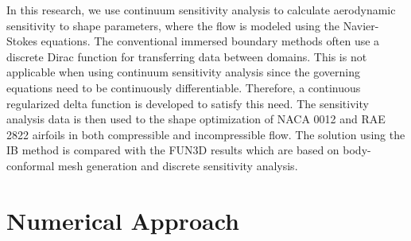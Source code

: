 \documentclass[12pt]{aiaa-pretty}
\begin{document}
In this research, we use continuum sensitivity analysis to calculate aerodynamic sensitivity to shape parameters, where the flow is modeled using the Navier-Stokes equations. The conventional immersed boundary methods often use a discrete Dirac function for transferring data between domains. This is not applicable when using continuum sensitivity analysis since the governing equations need to be continuously differentiable. Therefore, a continuous regularized delta function is developed to satisfy this need. The sensitivity analysis data is then used to the shape optimization of NACA 0012 and RAE 2822 airfoils in both compressible and incompressible flow. The solution using the IB method is compared with the FUN3D results which are based on body-conformal mesh generation and discrete sensitivity analysis.

\section{Numerical Approach}
\end{document}
